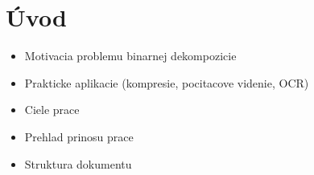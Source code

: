 \section*{Úvod}
\vspace{0.5cm}


\begin{itemize}
    \item Motivacia problemu binarnej dekompozicie


    \item Prakticke aplikacie (kompresie, pocitacove videnie, OCR)


    \item Ciele prace


    \item Prehlad prinosu prace


    \item Struktura dokumentu


\end{itemize}

